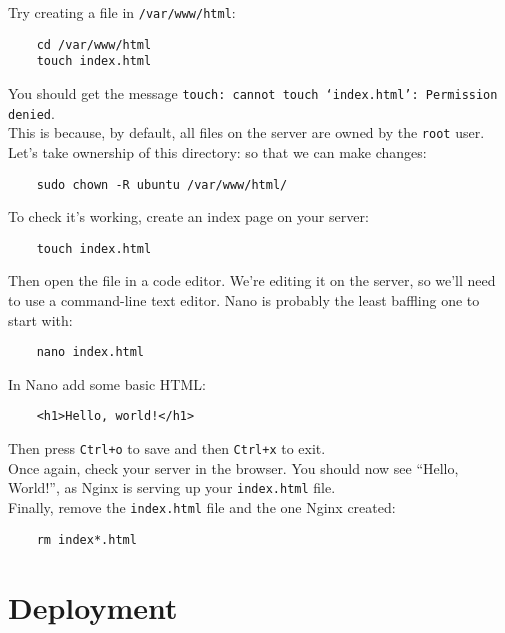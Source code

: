 Try creating a file in \texttt{/var/www/html}:

\begin{verbatim}
    cd /var/www/html
    touch index.html
\end{verbatim}

You should get the message \texttt{touch: cannot touch `index.html': Permission denied}.
\\

This is because, by default, all files on the server are owned by the \texttt{root} user.
\\

Let's take ownership of this directory: so that we can make changes:

\begin{verbatim}
    sudo chown -R ubuntu /var/www/html/
\end{verbatim}

To check it's working, create an index page on your server:

\begin{verbatim}
    touch index.html
\end{verbatim}

Then open the file in a code editor. We're editing it on the server, so we'll need to use a command-line text editor. Nano is probably the least baffling one to start with:

\begin{verbatim}
    nano index.html
\end{verbatim}

In Nano add some basic HTML:

\begin{verbatim}
    <h1>Hello, world!</h1>
\end{verbatim}

Then press \texttt{Ctrl+o} to save and then \texttt{Ctrl+x} to exit.
\\

Once again, check your server in the browser. You should now see ``Hello, World!'', as Nginx is serving up your \texttt{index.html} file.
\\

Finally, remove the \texttt{index.html} file and the one Nginx created:

\begin{verbatim}
    rm index*.html
\end{verbatim}


\section{Deployment}

